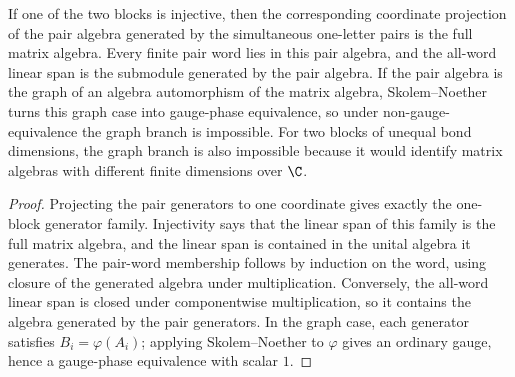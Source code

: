 \begin{lemma}
    \label{lem:pair_algebra_projection_fullness}
    \leanok
    If one of the two blocks is injective, then the corresponding coordinate
    projection of the pair algebra generated by the simultaneous one-letter
    pairs is the full matrix algebra. Every finite pair word lies in this pair
    algebra, and the all-word linear span is the submodule generated by the
    pair algebra. If the pair algebra is the graph of an algebra automorphism
    of the matrix algebra, Skolem--Noether turns this graph case into
    gauge-phase equivalence, so under non-gauge-equivalence the graph branch is
    impossible. For two blocks of unequal bond dimensions, the graph branch is
    also impossible because it would identify matrix algebras with different
    finite dimensions over $\C$.
\end{lemma}

\begin{proof}
    \leanok
    Projecting the pair generators to one coordinate gives exactly the
    one-block generator family. Injectivity says that the linear span of this
    family is the full matrix algebra, and the linear span is contained in the
    unital algebra it generates. The pair-word membership follows by induction
    on the word, using closure of the generated algebra under multiplication.
    Conversely, the all-word linear span is closed under componentwise
    multiplication, so it contains the algebra generated by the pair generators.
    In the graph case, each generator satisfies $B_i=\varphi(A_i)$; applying
    Skolem--Noether to $\varphi$ gives an ordinary gauge, hence a gauge-phase
    equivalence with scalar $1$.
\end{proof}

